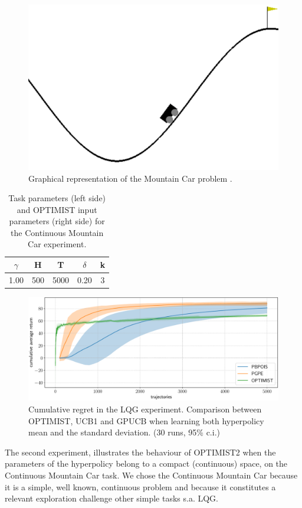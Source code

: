 \begin{figure}[t!] 
\centering
\includegraphics[width=.6\textwidth,keepaspectratio]{Images/MC.png}
\caption{Graphical representation of the Mountain Car problem \cite{gym}.} 
\label{fig:MC}
\end{figure} 

\begin{table}[t!]
\centering
\begin{tabular}{ccc|cc} 
\toprule
$\gamma$ & H & T & $\delta$ & k\\ 
\midrule
1.00 & 500 & 5000 & 0.20 & 3\\
\bottomrule
\end{tabular}
\caption{Task parameters (left side) and \gls{OPTIMIST} input parameters (right side) for the Continuous Mountain Car experiment.}
\label{tab:MCcoeff}
\end{table}

\begin{figure}[t!] 
\centering
\includegraphics[width=\textwidth,height=\textheight,keepaspectratio]{Images/MC_mu.pdf}
\caption{Cumulative regret in
the \gls{LQG} experiment. Comparison between
\gls{OPTIMIST}, \gls{UCB}1 and \gls{GPUCB} when learning both hyperpolicy mean and the standard deviation.
(30 runs, 95\% c.i.)} 
\label{fig:MCcomparison} 
\end{figure}

The second experiment, illustrates the behaviour of \gls{OPTIMIST}2  
when the parameters of the hyperpolicy belong to a compact (continuous) space, on the Continuous Mountain Car task\cite{brockman2016openai}. We chose the Continuous Mountain Car because it is a simple, well known, continuous problem and because it constitutes a relevant exploration challenge \wrt other simple tasks s.a. \gls{LQG}. 

